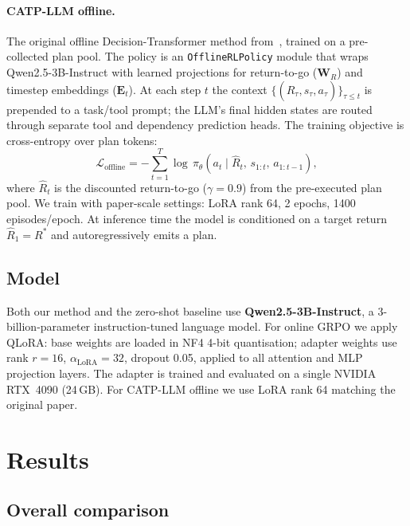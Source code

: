 \documentclass[10pt,twocolumn]{article}
\begin{document}
\paragraph{CATP-LLM offline.}
The original offline Decision-Transformer method from~\cite{openCATPlm2024},
trained on a pre-collected plan pool.
The policy is an \texttt{OfflineRLPolicy} module that wraps
Qwen2.5-3B-Instruct with learned projections for return-to-go
($\mathbf{W}_R$) and timestep embeddings ($\mathbf{E}_t$).
At each step $t$ the context
$\{(\hat{R}_\tau, s_\tau, a_\tau)\}_{\tau \le t}$ is prepended to a
task/tool prompt; the LLM's final hidden states are routed through
separate tool and dependency prediction heads.
The training objective is cross-entropy over plan tokens:
\begin{equation}
  \mathcal{L}_\text{offline}
  = -\sum_{t=1}^{T} \log\, \pi_\theta\!\left(a_t \mid \hat{R}_t,\,
    s_{1:t},\, a_{1:t-1}\right),
  \label{eq:offline_loss}
\end{equation}
where $\hat{R}_t$ is the discounted return-to-go ($\gamma{=}0.9$) from
the pre-executed plan pool.
We train with paper-scale settings: LoRA rank 64, 2 epochs,
1400 episodes/epoch.
At inference time the model is conditioned on a target return
$\hat{R}_1 = R^*$ and autoregressively emits a plan.

\subsection{Model}
Both our method and the zero-shot baseline use \textbf{Qwen2.5-3B-Instruct},
a 3-billion-parameter instruction-tuned language model.
For online GRPO we apply QLoRA: base weights are loaded in NF4 4-bit
quantisation; adapter weights use rank $r{=}16$, $\alpha_\text{LoRA}{=}32$,
dropout 0.05, applied to all attention and MLP projection layers.
The adapter is trained and evaluated on a single NVIDIA RTX~4090 (24\,GB).
For CATP-LLM offline we use LoRA rank 64 matching the original paper.

\section{Results}

\subsection{Overall comparison}
\end{document}
